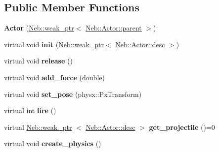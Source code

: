 \subsection*{\-Public \-Member \-Functions}
\begin{DoxyCompactItemize}
\item 
\hypertarget{classNeb_1_1Actor_1_1Actor_a265e7311ff69644021d1afb10c23359b}{{\bfseries \-Actor} (\hyperlink{classNeb_1_1weak__ptr}{\-Neb\-::weak\-\_\-ptr}$<$ \hyperlink{classNeb_1_1Actor_1_1parent}{\-Neb\-::\-Actor\-::parent} $>$)}\label{classNeb_1_1Actor_1_1Actor_a265e7311ff69644021d1afb10c23359b}

\item 
\hypertarget{classNeb_1_1Actor_1_1Actor_a80559b97a62a8b88fee0cf836a767647}{virtual void {\bfseries init} (\hyperlink{classNeb_1_1weak__ptr}{\-Neb\-::weak\-\_\-ptr}$<$ \hyperlink{classNeb_1_1Actor_1_1desc}{\-Neb\-::\-Actor\-::desc} $>$)}\label{classNeb_1_1Actor_1_1Actor_a80559b97a62a8b88fee0cf836a767647}

\item 
\hypertarget{classNeb_1_1Actor_1_1Actor_ab691c3abd3478b30ea327842ff56e74d}{virtual void {\bfseries release} ()}\label{classNeb_1_1Actor_1_1Actor_ab691c3abd3478b30ea327842ff56e74d}

\item 
\hypertarget{classNeb_1_1Actor_1_1Actor_a49e21cfc8c2dd2877a583ae2d517f599}{virtual void {\bfseries add\-\_\-force} (double)}\label{classNeb_1_1Actor_1_1Actor_a49e21cfc8c2dd2877a583ae2d517f599}

\item 
\hypertarget{classNeb_1_1Actor_1_1Actor_a7425d4e3f9aa9aba21609062168df127}{virtual void {\bfseries set\-\_\-pose} (physx\-::\-Px\-Transform)}\label{classNeb_1_1Actor_1_1Actor_a7425d4e3f9aa9aba21609062168df127}

\item 
\hypertarget{classNeb_1_1Actor_1_1Actor_a0e9aaac73787c060d35dfe38195e1795}{virtual int {\bfseries fire} ()}\label{classNeb_1_1Actor_1_1Actor_a0e9aaac73787c060d35dfe38195e1795}

\item 
\hypertarget{classNeb_1_1Actor_1_1Actor_aacbf027f0fa4bd8c505c7c604f6374c0}{virtual \hyperlink{classNeb_1_1weak__ptr}{\-Neb\-::weak\-\_\-ptr}\*
$<$ \hyperlink{classNeb_1_1Actor_1_1desc}{\-Neb\-::\-Actor\-::desc} $>$ {\bfseries get\-\_\-projectile} ()=0}\label{classNeb_1_1Actor_1_1Actor_aacbf027f0fa4bd8c505c7c604f6374c0}

\item 
\hypertarget{classNeb_1_1Actor_1_1Actor_a281ff959835d2193a555e78f0c14295b}{virtual void {\bfseries create\-\_\-physics} ()}\label{classNeb_1_1Actor_1_1Actor_a281ff959835d2193a555e78f0c14295b}


\end{DoxyCompactItemize}
